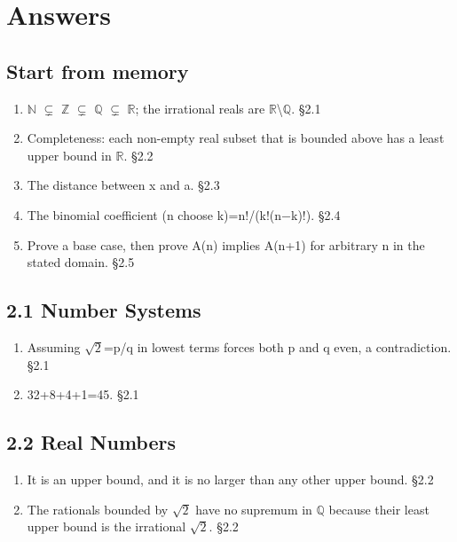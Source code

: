 \documentclass[11pt]{article}
\begin{document}
\clearpage
\section{Answers}
\begin{keepsection}\subsection{Start from memory}

\begin{enumerate}
\item \ensuremath{\mathbb{N}} \ensuremath{\subsetneq} \ensuremath{\mathbb{Z}} \ensuremath{\subsetneq} \ensuremath{\mathbb{Q}} \ensuremath{\subsetneq} \ensuremath{\mathbb{R}}; the irrational reals are \ensuremath{\mathbb{R}}\textbackslash{}\ensuremath{\mathbb{Q}}. \hfill{\small\color{FAUblue}§2.1}
\item Completeness: each non-empty real subset that is bounded above has a least upper bound in \ensuremath{\mathbb{R}}. \hfill{\small\color{FAUblue}§2.2}
\item The distance between x and a. \hfill{\small\color{FAUblue}§2.3}
\item The binomial coefficient (n choose k)=n!/(k!(n\ensuremath{-}k)!). \hfill{\small\color{FAUblue}§2.4}
\item Prove a base case, then prove A(n) implies A(n+1) for arbitrary n in the stated domain. \hfill{\small\color{FAUblue}§2.5}
\end{enumerate}

\end{keepsection}
\begin{keepsection}\subsection{2.1 Number Systems}

\begin{enumerate}
\item Assuming \ensuremath{\sqrt{2}}=p/q in lowest terms forces both p and q even, a contradiction. \hfill{\small\color{FAUblue}§2.1}
\item 32+8+4+1=45. \hfill{\small\color{FAUblue}§2.1}
\end{enumerate}

\end{keepsection}
\begin{keepsection}\subsection{2.2 Real Numbers}

\begin{enumerate}
\item It is an upper bound, and it is no larger than any other upper bound. \hfill{\small\color{FAUblue}§2.2}
\item The rationals bounded by \ensuremath{\sqrt{2}} have no supremum in \ensuremath{\mathbb{Q}} because their least upper bound is the irrational \ensuremath{\sqrt{2}}. \hfill{\small\color{FAUblue}§2.2}
\end{enumerate}

\end{keepsection}
\end{document}

